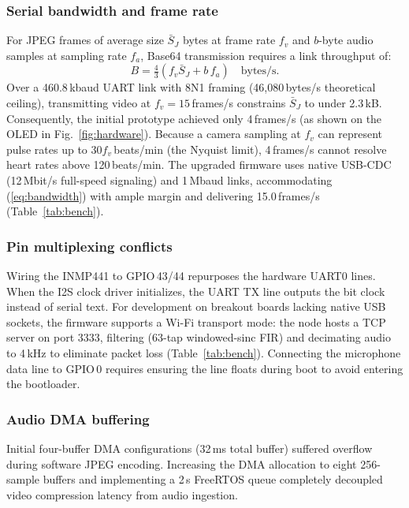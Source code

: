 \documentclass[journal]{IEEEtran}
\begin{document}
\subsubsection{Serial bandwidth and frame rate}
For JPEG frames of average size $\bar S_J$ bytes at frame rate $f_v$ and $b$-byte audio samples at sampling rate $f_a$, Base64 transmission requires a link throughput of:
\begin{equation}
  B = \tfrac{4}{3}\left(f_v \bar S_J + b\, f_a\right)\quad \text{bytes/s}.
  \label{eq:bandwidth}
\end{equation}
Over a 460.8\,kbaud UART link with 8N1 framing (46,080\,bytes/s theoretical ceiling), transmitting video at $f_v=15$\,frames/s constrains $\bar S_J$ to under 2.3\,kB. Consequently, the initial prototype achieved only 4\,frames/s (as shown on the OLED in Fig.~\ref{fig:hardware}). Because a camera sampling at $f_v$ can represent pulse rates up to $30 f_v$\,beats/min (the Nyquist limit), 4\,frames/s cannot resolve heart rates above 120\,beats/min. The upgraded firmware uses native USB-CDC (12\,Mbit/s full-speed signaling) and 1\,Mbaud links, accommodating (\ref{eq:bandwidth}) with ample margin and delivering 15.0\,frames/s (Table~\ref{tab:bench}).

\subsubsection{Pin multiplexing conflicts}
Wiring the INMP441 to GPIO\,43/44 repurposes the hardware UART0 lines. When the I2S clock driver initializes, the UART TX line outputs the bit clock instead of serial text. For development on breakout boards lacking native USB sockets, the firmware supports a Wi-Fi transport mode: the node hosts a TCP server on port 3333, filtering (63-tap windowed-sinc FIR) and decimating audio to 4\,kHz to eliminate packet loss (Table~\ref{tab:bench}). Connecting the microphone data line to GPIO\,0 requires ensuring the line floats during boot to avoid entering the bootloader.

\subsubsection{Audio DMA buffering}
Initial four-buffer DMA configurations (32\,ms total buffer) suffered overflow during software JPEG encoding. Increasing the DMA allocation to eight 256-sample buffers and implementing a 2\,s FreeRTOS queue completely decoupled video compression latency from audio ingestion.
\end{document}
